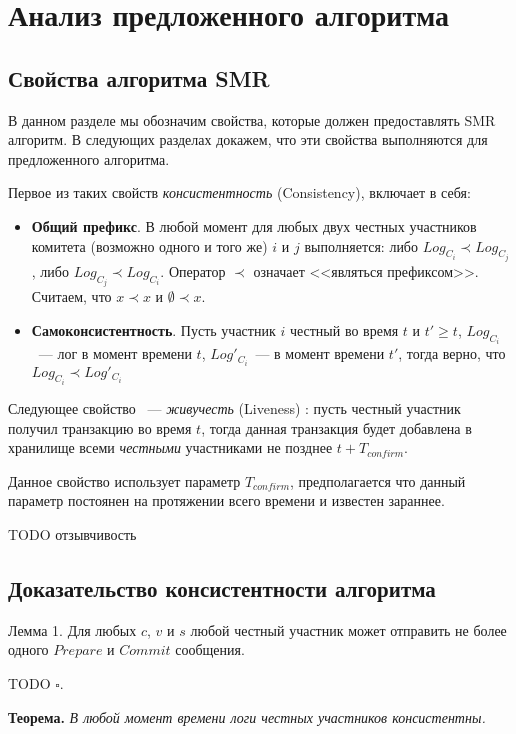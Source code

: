 
\chapter{Анализ предложенного алгоритма}  \label{chapter3}

\section{Свойства алгоритма SMR}
В данном разделе мы обозначим свойства, которые должен предоставлять SMR алгоритм. В следующих разделах докажем, что эти свойства выполняются для предложенного алгоритма.

Первое из таких свойств \textit{консистентность} (Consistency)\cite{hybrid-consensus}, включает в себя:
\begin{itemize}
\item \textbf{Общий префикс}. В любой момент для любых двух честных участников комитета (возможно одного и того же) $i$ и $j$  выполняется: либо $Log_{C_i} \prec Log_{C_j}$, либо $Log_{C_j} \prec Log_{C_i}$. Оператор $\prec$ означает <<являться префиксом>>. Считаем, что $x \prec x$ и $\emptyset \prec x$.
\item \textbf{Самоконсистентность}. Пусть участник $i$ честный во время $t$ и $t' \ge t$, $Log_{C_i}$~--- лог в момент времени $t$, $Log'_{C_i}$~--- в момент времени $t'$, тогда верно, что $Log_{C_i} \prec Log'_{C_i}$
\end{itemize}

\noindent Следующее свойство ~--- \textit{живучесть} (Liveness) \cite{hybrid-consensus}:
пусть честный участник получил транзакцию во время $t$, тогда данная транзакция будет добавлена в хранилище всеми \textit{честными} участниками не позднее $t + T_{confirm}$.

Данное свойство использует параметр $T_{confirm}$, предполагается что данный параметр постоянен на протяжении всего времени и известен зараннее.

TODO отзывчивость

\section{Доказательство консистентности алгоритма}
Лемма 1. Для любых $c$, $v$ и $s$ любой честный участник может отправить не более одного $Prepare$ и $Commit$ сообщения.

TODO $\square$.

\textbf{Теорема.} \textit{В любой момент времени логи честных участников консистентны.}

